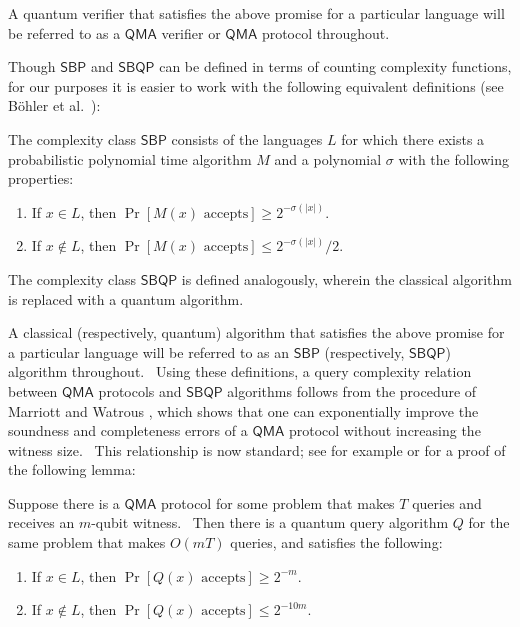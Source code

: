 A quantum verifier that satisfies the above
promise for a particular language will be referred to as a $\mathsf{QMA}$
verifier or $\mathsf{QMA}$ protocol throughout.

Though $\mathsf{SBP}$ and $\mathsf{SBQP}$ can be defined in terms of
counting complexity functions, for our purposes it is easier to
work with the following equivalent definitions (see B\"ohler et al.\ \cite
{BGM06}):

\begin{definition}
\label{def:sbp_sbqp} The complexity class $\mathsf{SBP}$ consists of the
languages $L$ for which there exists a probabilistic polynomial time
algorithm $M$ and a polynomial $\sigma$ with the following properties:

\begin{enumerate}
\item If $x \in L$, then $\Pr\left[M(x) \text{ accepts}\right] \ge
2^{-\sigma(|x|)}$.

\item If $x \not\in L$, then $\Pr\left[M(x) \text{ accepts}\right] \le
2^{-\sigma(|x|)}/2$.
\end{enumerate}

The complexity class $\mathsf{SBQP}$ is defined analogously, wherein the
classical algorithm is replaced with a quantum algorithm.
\end{definition}

A classical (respectively, quantum) algorithm that satisfies the above
promise for a particular language will be referred to as an $\mathsf{SBP}$
(respectively, $\mathsf{SBQP}$) algorithm throughout. \ Using these
definitions, a  query complexity relation between $\mathsf{QMA}$
protocols and $\mathsf{SBQP}$ algorithms follows from the procedure of
Marriott and Watrous \cite{marriott}, which shows that one can exponentially
improve the soundness and completeness errors of a $\mathsf{QMA}$ protocol
without increasing the witness size. \ 
This relationship is now standard; see
for example \cite[Remark 6]{marriott} or \cite[Proposition 4.2]
{sherstov2019vanishing} for a proof of the following lemma:

\begin{lemma} 
\label{lem:guessing} Suppose there is a $\mathsf{QMA}$ protocol for some
problem that makes $T$ queries and receives an $m$-qubit witness. \ Then
there is a quantum query algorithm $Q$ for the same problem that makes $O(mT)$ queries, and satisfies the following:

\begin{enumerate}
\item If $x \in L$, then $\Pr\left[Q(x) \text{ accepts}\right] \ge
2^{-m}$.

\item If $x \not\in L$, then $\Pr\left[Q(x) \text{ accepts}\right] \le
2^{-10m}$.
\end{enumerate}
\end{lemma}


%
